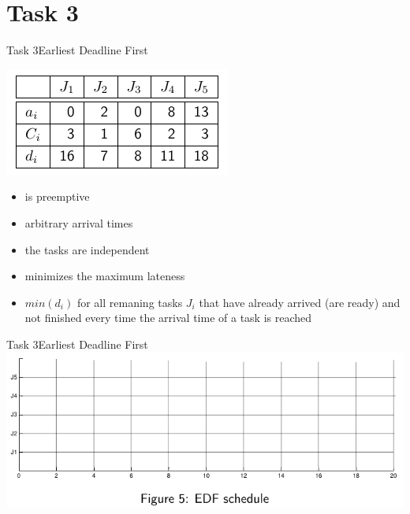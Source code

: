 
\section{Task 3}

\setcounter{task}{1}

\begin{frame}[shrink=10]{Task 3}{Earliest Deadline First}
  \vspace{0.5cm}
  \begin{tasknoinc}
    \centering
    \includegraphics[height=0.2\paperheight]{./figures/3_tab.png}
  \end{tasknoinc}
  \begin{requirements}
    \begin{itemize}
      \item is \alert{preemptive}
      \item \alert{arbitrary arrival times}
      \item the tasks are \alert{independent}
      \item \alert{minimizes} the \alert{maximum lateness}
      \item $min(d_i)$ for all remaning tasks $J_i$  that have already \alert{arrived} (are ready) and \alert{not finished} \alert{every time} the \alert{arrival time} of a task is reached
    \end{itemize}
  \end{requirements}
\end{frame}

\begin{frame}{Task 3}{Earliest Deadline First}
  \includegraphics[width=\textwidth]{./figures/3_empty.png}
\end{frame}

